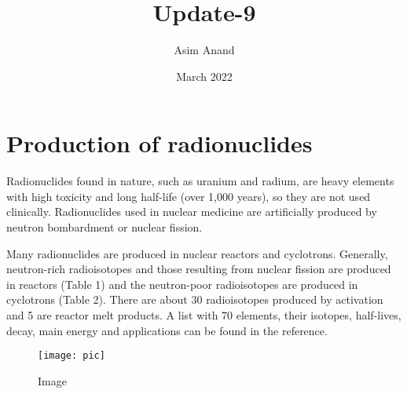 \documentclass{article}
\title{Update-9}
\author{Asim Anand}
\date{March 2022}
\begin{document}
\maketitle

\section{Production of radionuclides}
Radionuclides found in nature, such as uranium and radium, are heavy elements with high toxicity and long half-life (over 1,000 years), so they are not used clinically. Radionuclides used in nuclear medicine  are  artificially  produced  by  neutron bombardment or nuclear fission. 

Many  radionuclides  are  produced  in  nuclear reactors  and  cyclotrons.  Generally,  neutron-rich radioisotopes  and  those  resulting  from  nuclear fission are produced in reactors (Table 1) and the neutron-poor  radioisotopes  are  produced  in cyclotrons  (Table  2).  There  are  about  30 radioisotopes  produced  by  activation  and  5  are reactor melt products. A list with 70 elements, their isotopes,  half-lives,  decay,  main  energy  and applications can be found in the reference. 

\begin{figure}[htp]
    \centering
    \texttt{[image: pic]}
    \caption{Image}
    \label{fig:galaxy}
\end{figure}
\end{document}

